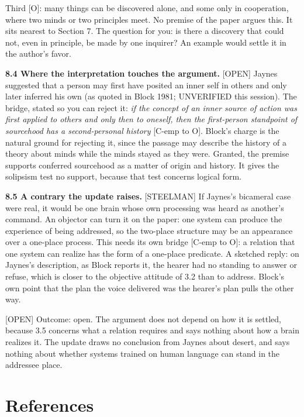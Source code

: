 \documentclass[11pt]{article}
\newcommand{\register}[1]{{\ttfamily\small #1}}
\begin{document}
Third [O]: many things can be discovered alone, and some only in cooperation, where two minds or two principles meet. No premise of the paper argues this. It sits nearest to Section 7. The question for you: is there a discovery that could not, even in principle, be made by one inquirer? An example would settle it in the author's favor.

\textbf{8.4 Where the interpretation touches the argument.} \register{[OPEN]} Jaynes suggested that a person may first have posited an inner self in others and only later inferred his own (as quoted in Block 1981; UNVERIFIED this session). The bridge, stated so you can reject it: \emph{if the concept of an inner source of action was first applied to others and only then to oneself, then the first-person standpoint of sourcehood has a second-personal history} [C-emp to O]. Block's charge is the natural ground for rejecting it, since the passage may describe the history of a theory about minds while the minds stayed as they were. Granted, the premise supports conferred sourcehood as a matter of origin and history. It gives the solipsism test no support, because that test concerns logical form.

\textbf{8.5 A contrary the update raises.} \register{[STEELMAN]} If Jaynes's bicameral case were real, it would be one brain whose own processing was heard as another's command. An objector can turn it on the paper: one system can produce the experience of being addressed, so the two-place structure may be an appearance over a one-place process. This needs its own bridge [C-emp to O]: a relation that one system can realize has the form of a one-place predicate. A sketched reply: on Jaynes's description, as Block reports it, the hearer had no standing to answer or refuse, which is closer to the objective attitude of 3.2 than to address. Block's own point that the plan the voice delivered was the hearer's plan pulls the other way.

\register{[OPEN]} Outcome: open. The argument does not depend on how it is settled, because 3.5 concerns what a relation requires and says nothing about how a brain realizes it. The update draws no conclusion from Jaynes about desert, and says nothing about whether systems trained on human language can stand in the addressee place.

\section*{References}
\end{document}
